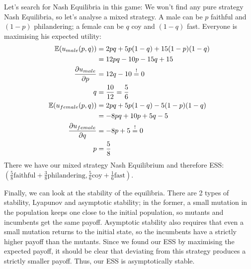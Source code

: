 \documentclass{article}
\newcommand{\E}{\mathbb{E}}
\begin{document}
	Let's search for Nash Equilibria in this game: We won't find any pure strategy Nash Equilibria, so let's analyse a mixed strategy. A male can be $p$ faithful and $(1-p)$ philandering; a female can be $q$ coy and $(1-q)$ fast. Everyone is maximising his expected utility:
	\begin{align}
		\E(u_{male}(p,q)) &= 2pq + 5p(1-q) + 15(1-p)(1-q) \notag \\
		&= 12pq - 10p - 15q + 15 \notag \\
		\frac{\partial u_{male}}{\partial p} &= 12q - 10 \overset{!}{=} 0 \notag \\
		q &= \frac{10}{12} = \frac{5}{6} \notag \\
		\E(u_{female}(p,q)) &= 2pq + 5p(1-q) - 5(1-p)(1-q) \notag \\
		&= -8pq + 10p + 5q - 5 \notag \\
		\frac{\partial u_{female}}{\partial q} &= -8p + 5 \overset{!}{=} 0 \notag \\
		p &= \frac{5}{8} \notag
	\end{align}
	There we have our mixed strategy Nash Equilibrium and therefore ESS: $\left(\frac{5}{8}\text{faithful} + \frac{3}{8}\text{philandering}, \frac{5}{6}\text{coy} + \frac{1}{6}\text{fast}\right)$.
	
	Finally, we can look at the stability of the equilibria. There are 2 types of stability, Lyapunov and asymptotic stability; in the former, a small mutation in the population keeps one close to the initial population, so mutants and incumbents get the same payoff. Asymptotic stability also requires that even a small mutation returns to the initial state, so the incumbents have a strictly higher payoff than the mutants. Since we found our ESS by maximising the expected payoff, it should be clear that deviating from this strategy produces a strictly smaller payoff. Thus, our ESS is asymptotically stable.
	
	\printbibliography
\end{document}
